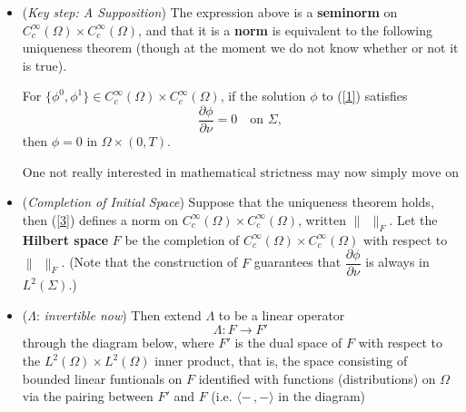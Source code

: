 \begin{itemize}
\begin{proofc}
    Applying Green's formula in the space (not space--time), we get
    \[
        \int_{\Omega\times(0,T)} \psi\triangle\phi-\phi\triangle\psi
        =\int_{\partial\Omega\times(0,T)} \psi\frac{\partial\phi}{\partial\nu}
        -\phi\frac{\partial\psi}{\partial\nu}
        =\int_{\partial\Omega\times(0,T)} \psi\frac{\partial\phi}{\partial\nu}
        =\int_\Sigma \bigg(\frac{\partial\phi}{\partial\nu}\bigg)^2.\quad
    \]
    Plus, one--dimensional calculus on the $t$-axis yields
    \[\int_{\Omega\times(0,T)}(\psi\phi''-\phi\psi'')
    =\int_{\Omega\times T}(\psi\phi'-\phi\psi')
    -\int_{\Omega\times 0}(\psi\phi'-\phi\psi')
    =\int_{\Omega\times0}(\phi\psi'-\psi\phi').\]
    The left sides of the two lines coincide by the wave equation, 
    thus so do the right sides.
\end{proofc}
\item \textcolor{ff00ff}{(\textit{Key step: A Supposition})} 
The expression above is a \textbf{seminorm} 
on $C_c^\infty(\Omega) \times C_c^\infty(\Omega)$, 
and that it is a \textbf{norm} is equivalent to the following uniqueness theorem 
(though at the moment we do not know whether or not it is true).
\begin{UT}
    For $\{\phi^0,\phi^1\}\in C_c^\infty(\Omega) \times C_c^\infty(\Omega)$, 
    if the solution $\phi$ to (\ref{1}) satisfies
    \[\frac{\partial\phi}{\partial\nu}=0\quad\text{on }\Sigma,\]
    then $\phi=0$ in $\Omega\times(0,T)$.
\end{UT}
$\boxed{\text{One not really interested in mathematical strictness 
may now simply move on to the final step.}}$
\item (\textit{Completion of Initial Space}) 
Suppose that the uniqueness theorem holds, then (\ref{3}) defines 
a norm on $C_c^\infty(\Omega) \times C_c^\infty(\Omega)$, written $\|\ \ \|_F$. 
Let the \textcolor{cc9999}{\textbf{Hilbert space}} $F$ be the completion of 
$C_c^\infty(\Omega) \times C_c^\infty(\Omega)$ with respect to $\|\ \ \|_F$. 
(Note that the construction of $F$ guarantees that 
$\dfrac{\partial\phi}{\partial\nu}$ is always in $L^2(\Sigma)$.)
\item ($\Lambda$: \textit{invertible now}) 
Then extend $\Lambda$ to be a linear operator
\[\Lambda\colon F\to F'\]
through the diagram below, where $F'$ is the dual space of $F$ 
with respect to the $L^2(\Omega) \times L^2(\Omega)$ inner product, that is, 
the space consisting of bounded linear funtionals on $F$ 
identified with functions (distributions) on $\Omega$ via the pairing 
between $F'$ and $F$ (i.e. $\langle-\,,-\rangle$ in the diagram) 

\end{itemize}
